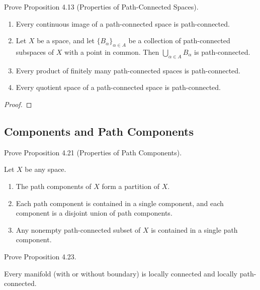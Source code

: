 \begin{exercise}{4.14}
    Prove Proposition 4.13 (Properties of Path-Connected Spaces).
    \begin{enumerate}[label={(\alph*)}]
        \item Every continuous image of a path-connected space is path-connected.
        \item Let $X$ be a space, and let ${\{ B_{\alpha} \}}_{\alpha\in A}$ be a collection of path-connected subspaces of $X$ with a point in common. Then $\bigcup_{\alpha\in A}B_{\alpha}$ is path-connected.
        \item Every product of finitely many path-connected spaces is path-connected.
        \item Every quotient space of a path-connected space is path-connected.
    \end{enumerate}
\end{exercise}

\begin{proof}
\end{proof}

\subsection*{Components and Path Components}

\begin{exercise}{4.22}
    Prove Proposition 4.21 (Properties of Path Components).

    Let $X$ be any space.
    \begin{enumerate}[label={(\alph*)}]
        \item The path components of $X$ form a partition of $X$.
        \item Each path component is contained in a single component, and each component is a disjoint union of path components.
        \item Any nonempty path-connected subset of $X$ is contained in a single path component.
    \end{enumerate}
\end{exercise}

\begin{exercise}{4.24}
    Prove Proposition 4.23.

    Every manifold (with or without boundary) is locally connected and locally path-connected.
\end{exercise}

